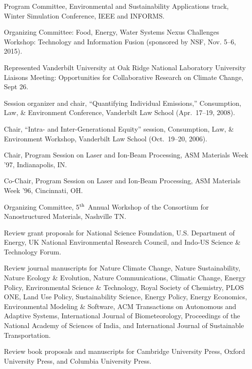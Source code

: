 \item[2016--present] Program Committee, Environmental and Sustainability Applications track, Winter Simulation Conference, IEEE and INFORMS.
\item[2015] Organizing Committee: Food, Energy, Water Systems Nexus Challenges Workshop: Technology and Information Fusion (sponsored by NSF, Nov. 5--6, 2015).
\item[2007] Represented Vanderbilt University at Oak Ridge National Laboratory University Liaisons Meeting: Opportunities for Collaborative Research on Climate Change, Sept 26.
\item[2008] Session organizer and chair, ``Quantifying Individual Emissions,'' Consumption, Law, \& Environment Conference, Vanderbilt Law School (Apr.\ 17--19, 2008).
\item[2006] Chair, ``Intra- and Inter-Generational Equity'' session, Consumption, Law, \& Environment Workshop, Vanderbilt Law School (Oct.~19--20, 2006).
\item[1997] Chair, Program Session on Laser and Ion-Beam Processing, ASM Materials Week '97, In\-di\-an\-a\-po\-lis, IN.
\item[1996] Co-Chair, Program Session on Laser and Ion-Beam Processing, ASM Materials Week '96, Cincinnati, OH.
\item[1996] Organizing Committee, 5$^{\mbox{\scriptsize th}}$ Annual Workshop of the Consortium for Nanostructured Materials, Nashville TN.
\item[Ongoing] Review grant proposals for National Science Foundation, U.S. Department of Energy, UK National Environmental Research Council, and Indo-US Science \& Technology Forum.
\item[Ongoing] Review journal manuscripts for
    Nature Climate Change,
    Nature Sustainability,
    Nature Ecology \& Evolution,
    Nature Communications,
    Climatic Change,
    Energy Policy,
    Environmental Science \& Technology,
    Royal Society of Chemistry,
    PLOS ONE,
    Land Use Policy,
    Sustainability Science,
    Energy Policy,
    Energy Economics,
    Environmental Modeling \& Software,
    ACM Transactions on Autonomous and Adaptive Systems,
    International Journal of Biometeorology,
    Proceedings of the National Academy of Sciences of India,
    and
    International Journal of Sustainable Transportation.
\item[Ongoing] Review book proposals and manuscripts for Cambridge University Press, Oxford University Press, and Columbia University Press.

